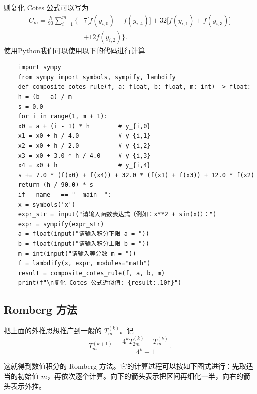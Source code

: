 则复化 Cotes 公式可以写为
\[
\begin{aligned}
	C_m
	=\frac{h}{90}\sum_{i=1}^{m}
	\bigl\{&7\bigl[f(y_{i,0})+f(y_{i,4})\bigr]
	+32\bigl[f(y_{i,1})+f(y_{i,3})\bigr] \\
	&+12f(y_{i,2})\bigr\}.
\end{aligned}
\]
使用Python我们可以使用以下的代码进行计算
\begin{verbatim}
	import sympy
	from sympy import symbols, sympify, lambdify
	def composite_cotes_rule(f, a: float, b: float, m: int) -> float:
	h = (b - a) / m
	s = 0.0
	for i in range(1, m + 1):
	x0 = a + (i - 1) * h        # y_{i,0}
	x1 = x0 + h / 4.0           # y_{i,1}
	x2 = x0 + h / 2.0           # y_{i,2}
	x3 = x0 + 3.0 * h / 4.0     # y_{i,3}
	x4 = x0 + h                 # y_{i,4}
	s += 7.0 * (f(x0) + f(x4)) + 32.0 * (f(x1) + f(x3)) + 12.0 * f(x2)
	return (h / 90.0) * s
	if __name__ == "__main__":
	x = symbols('x')
	expr_str = input("请输入函数表达式（例如：x**2 + sin(x)）：")
	expr = sympify(expr_str)
	a = float(input("请输入积分下限 a = "))
	b = float(input("请输入积分上限 b = "))
	m = int(input("请输入等分数 m = "))
	f = lambdify(x, expr, modules="math")
	result = composite_cotes_rule(f, a, b, m)
	print(f"\n复化 Cotes 公式近似值: {result:.10f}")
\end{verbatim}
\subsection*{Romberg 方法}

把上面的外推思想推广到一般的 $T_m^{(k)}$。记
\[
T_m^{(k+1)}
=\frac{4^kT_{2m}^{(k)}-T_m^{(k)}}{4^k-1}.
\]

这就得到数值积分的 Romberg 方法。它的计算过程可以按如下图式进行：先取适当的初始值 $m$，再依次逐个计算。向下的箭头表示把区间再细化一半，向右的箭头表示外推。

\providecommand{\rombergstep}[1]{\tikz[baseline=(char.base)]{\node[draw,circle,inner sep=0.5pt,font=\scriptsize] (char) {#1};}}

